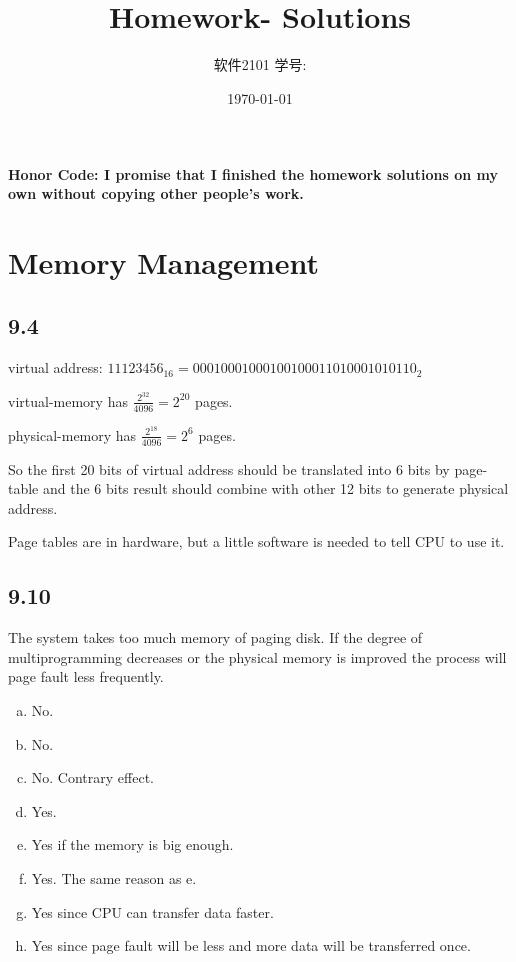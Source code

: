 \documentclass[11pt]{article}
\title{\vspace{-4cm}\CourseCodeName \space
        \Session \protect\\  Homework-\textbf{\Homework} Solutions}
\author{软件2101 \Name \space 学号: \SID}
\date{\today}
\begin{document}
\maketitle
\vspace{-0.8cm}
\textbf{Honor Code: I promise that I finished the homework solutions on my own without copying other people's 
    work.}

\section*{Memory Management}

\subsection*{9.4}

virtual address: $11123456_{16}={0001 0001 0001 0010 0011 0100 0101 0110}_2$

virtual-memory has $\displaystyle \frac{2^{32}}{4096} = 2^{20}$ pages.

physical-memory has $\displaystyle \frac{2^{18}}{4096} = 2^6$ pages.

So the first 20 bits of virtual address should be translated into 6 bits by page-table and the 6 bits result 
should combine with other 12 bits to generate physical address.

Page tables are in hardware, but a little software is needed to tell CPU to use it.

\subsection*{9.10}

The system takes too much memory of paging disk. If the degree of multiprogramming decreases or the physical memory is improved
the process will page fault less frequently. 

\begin{enumerate}[a. ]
    \item No.
    \item No.
    \item No. Contrary effect.
    \item Yes.
    \item Yes if the memory is big enough.
    \item Yes. The same reason as e.
    \item Yes since CPU can transfer data faster.
    \item Yes since page fault will be less and more data will be transferred once.
\end{enumerate}
\end{document}
